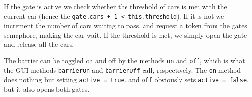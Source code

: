 If the gate is active we check whether the threshold of cars is met with the current car (hence the \texttt{gate.cars + 1 < this.threshold}). If it is not we increment the number of cars waiting to pass, and request a token from the gates semaphore, making the car wait. If the threshold is met, we simply open the gate and release all the cars.

The barrier can be toggled on and off by the methods \texttt{on} and \texttt{off}, which is what the GUI methods \texttt{barrierOn} and \texttt{barrierOff} call, respectively. The \texttt{on} method does nothing but setting \texttt{active = true}, and \texttt{off} obviously sets \texttt{active = false}, but it also opens both gates.

